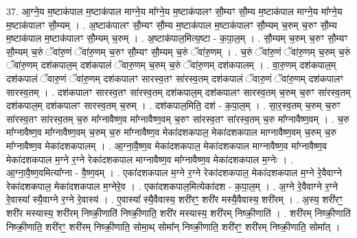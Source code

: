 \documentclass[17pt]{extarticle}
\begin{document}
37. आ॒ग्ने॒य म॒ष्टाक॑पाल म॒ष्टाक॑पाल माग्ने॒य मा᳚ग्ने॒य म॒ष्टाक॑पालꣳ सौ॒म्यꣳ सौ॒म्य म॒ष्टाक॑पाल माग्ने॒य मा᳚ग्ने॒य म॒ष्टाक॑पालꣳ सौ॒म्यम् । . अ॒ष्टाक॑पालꣳ सौ॒म्यꣳ सौ॒म्य म॒ष्टाक॑पाल म॒ष्टाक॑पालꣳ सौ॒म्यम् च॒रुम् च॒रुꣳ सौ॒म्य म॒ष्टाक॑पाल म॒ष्टाक॑पालꣳ सौ॒म्यम् च॒रुम् । . अ॒ष्टाक॑पाल॒मित्य॒ष्टा - क॒पा॒ल॒म् । . सौ॒म्यम् च॒रुम् च॒रुꣳ सौ॒म्यꣳ सौ॒म्यम् च॒रुं ॅवा॑रु॒णं ॅवा॑रु॒णम् च॒रुꣳ सौ॒म्यꣳ सौ॒म्यम् च॒रुं ॅवा॑रु॒णम् । . च॒रुं ॅवा॑रु॒णं ॅवा॑रु॒णम् च॒रुम् च॒रुं ॅवा॑रु॒णम् दश॑कपाल॒म् दश॑कपालं ॅवारु॒णम् च॒रुम् च॒रुं ॅवा॑रु॒णम् दश॑कपालम् । . वा॒रु॒णम् दश॑कपाल॒म् दश॑कपालं ॅवारु॒णं ॅवा॑रु॒णम् दश॑कपालꣳ सारस्व॒तꣳ सा॑रस्व॒तम् दश॑कपालं ॅवारु॒णं ॅवा॑रु॒णम् दश॑कपालꣳ सारस्व॒तम् । . दश॑कपालꣳ सारस्व॒तꣳ सा॑रस्व॒तम् दश॑कपाल॒म् दश॑कपालꣳ सारस्व॒तम् च॒रुम् च॒रुꣳ सा॑रस्व॒तम् दश॑कपाल॒म् दश॑कपालꣳ सारस्व॒तम् च॒रुम् । . दश॑कपाल॒मिति॒ दश॑ - क॒पा॒ल॒म् । . सा॒र॒स्व॒तम् च॒रुम् च॒रुꣳ सा॑रस्व॒तꣳ सा॑रस्व॒तम् च॒रु मा᳚ग्नावैष्ण॒व मा᳚ग्नावैष्ण॒वम् च॒रुꣳ सा॑रस्व॒तꣳ सा॑रस्व॒तम् च॒रु मा᳚ग्नावैष्ण॒वम् । . च॒रु मा᳚ग्नावैष्ण॒व मा᳚ग्नावैष्ण॒वम् च॒रुम् च॒रु मा᳚ग्नावैष्ण॒व मेका॑दशकपाल॒ मेका॑दशकपाल माग्नावैष्ण॒वम् च॒रुम् च॒रु मा᳚ग्नावैष्ण॒व मेका॑दशकपालम् । . आ॒ग्ना॒वै॒ष्ण॒व मेका॑दशकपाल॒ मेका॑दशकपाल माग्नावैष्ण॒व मा᳚ग्नावैष्ण॒व मेका॑दशकपाल म॒ग्ने र॒ग्ने रेका॑दशकपाल माग्नावैष्ण॒व मा᳚ग्नावैष्ण॒व मेका॑दशकपाल म॒ग्नेः । . आ॒ग्ना॒वै॒ष्ण॒वमित्या᳚ग्ना - वै॒ष्ण॒वम् । . एका॑दशकपाल म॒ग्ने र॒ग्ने रेका॑दशकपाल॒ मेका॑दशकपाल म॒ग्ने रे॒वैवाग्ने रेका॑दशकपाल॒ मेका॑दशकपाल म॒ग्नेरे॒व । . एका॑दशकपाल॒मित्येका॑दश - क॒पा॒ल॒म् । . अ॒ग्ने रे॒वैवाग्ने र॒ग्ने रे॒वास्या᳚ स्यै॒वाग्ने र॒ग्ने रे॒वास्य॑ । . ए॒वास्या᳚ स्यै॒वैवास्य॒ शरी॑रꣳ॒॒ शरी॑र मस्यै॒वैवास्य॒ शरी॑रम् । . अ॒स्य॒ शरी॑रꣳ॒॒ शरी॑र मस्यास्य॒ शरी॑रम् निष्क्री॒णाति॑ निष्क्री॒णाति॒ शरी॑र मस्यास्य॒ शरी॑रम् निष्क्री॒णाति॑ । . शरी॑रम् निष्क्री॒णाति॑ निष्क्री॒णाति॒ शरी॑रꣳ॒॒ शरी॑रम् निष्क्री॒णाति॒ सोमा॒थ् सोमा᳚न् निष्क्री॒णाति॒ शरी॑रꣳ॒॒ शरी॑रम् निष्क्री॒णाति॒ सोमा᳚त् । \newline
\end{document}
